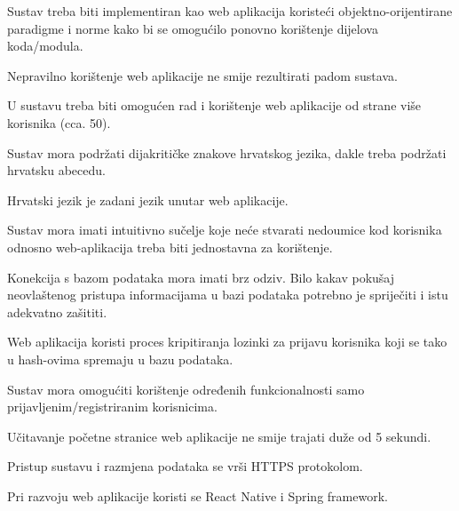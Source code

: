 \begin{packed_item}

	\item Sustav treba biti implementiran kao web aplikacija koristeći objektno-orijentirane paradigme i norme kako bi se omogućilo ponovno korištenje dijelova koda/modula.
	\item Nepravilno korištenje web aplikacije ne smije rezultirati padom sustava.
	\item U sustavu treba biti omogućen rad i korištenje web aplikacije od strane više korisnika (cca. 50).
	\item Sustav mora podržati dijakritičke znakove hrvatskog jezika, dakle treba podržati hrvatsku abecedu.
	\item Hrvatski jezik je zadani jezik unutar web aplikacije.
	\item Sustav mora imati intuitivno sučelje koje neće stvarati nedoumice kod korisnika odnosno web-aplikacija treba biti jednostavna za korištenje.
	\item Konekcija s bazom podataka mora imati brz odziv. Bilo kakav pokušaj neovlaštenog pristupa informacijama u bazi podataka potrebno je spriječiti i istu adekvatno zašititi.
	\item Web aplikacija koristi proces kripitiranja lozinki za prijavu korisnika koji se tako u hash-ovima spremaju u bazu podataka.
	\item Sustav mora omogućiti korištenje određenih funkcionalnosti samo prijavljenim/registriranim korisnicima.
	\item Učitavanje početne stranice web aplikacije ne smije trajati duže od 5 sekundi.
	\item Pristup sustavu i razmjena podataka se vrši HTTPS protokolom.
	\item Pri razvoju web aplikacije koristi se React Native i Spring framework.

\end{packed_item}



